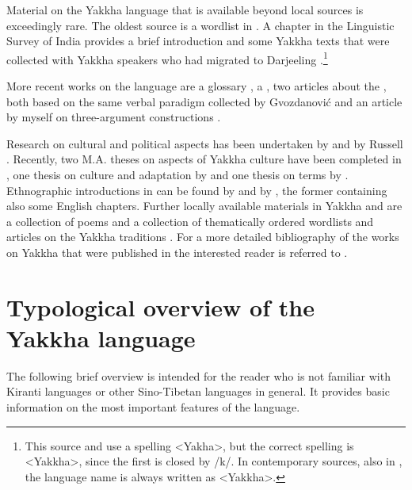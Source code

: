 Material on the Yakkha language that is available beyond local sources is exceedingly rare. The oldest source is a wordlist in \citet{Hodgson1857_Comparative}. A chapter in the Linguistic Survey of India provides a brief introduction and some Yakkha texts that were collected with Yakkha speakers who had migrated to Darjeeling \citep[305--315]{Grierson1909Linguistic}.\footnote{This source and \citet{Russell1992_Yakha} use a spelling <Yakha>, but the correct spelling is <Yakkha>, since the first  is closed by /k/. In contemporary sources, also  in , the language name is always written as <Yakkha>.} 

More recent works on the language are a  glossary \citep{Winter1996Glossary}, a   \citep{Kongren2007Yakkha}, two articles about the , both based on the same verbal paradigm collected by Gvozdanović \citep{Gvozdanovic1987How, Driem1994The-Yakkha} and an article by myself on three-argument constructions \citep{Schackow2012_Referential}.

Research on cultural and political aspects has been undertaken by \citet{Subba1999Politics} and by Russell \citep{Russell1992_Yakha, Russell1997Identity, Russell2000_Missing, Russell2004Traditions, Russell2007Writing, Russell2010_Perceptions}. Recently, two M.A. theses on aspects of Yakkha culture have been completed in , one thesis on culture and adaptation by \citet{Rai2011_Nature}  and one thesis on  terms by  \citet{Linkha2013_kinship}. Ethnographic introductions in  can be found by \citet{Kongren2007Indigenous} and by \citet{Linkha2067Yakkha}, the former containing also some English chapters. Further locally available materials in Yakkha and  are a collection of poems \citep{Dewan2001Opchyongme} and a  collection of thematically ordered wordlists and articles on the Yakkha traditions \citep{Linkha2005Yakkha}. For a more detailed bibliography of the works on Yakkha that were published in  the interested reader is referred to \cite{Rapachaetal2008Indo}. 

 

\section{Typological overview of the Yakkha language}\label{overview-yakkha}

The following brief overview is intended for the reader who is not familiar with Kiranti languages or other Sino-Tibetan languages in general. It provides basic information on the most important features of the language.

